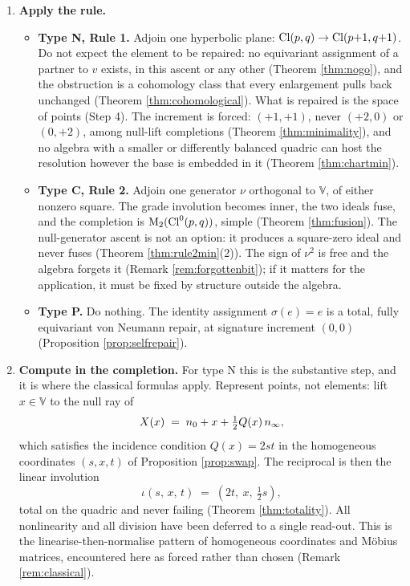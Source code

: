 \begin{enumerate}
\item[\textbf{Step 3.}] \textbf{Apply the rule.}
  \begin{itemize}
  \item \textbf{Type N, Rule 1.} Adjoin one hyperbolic plane: $\mathrm{Cl}(p,q) \to \mathrm{Cl}(p{+}1,q{+}1)$. Do not expect the element to be repaired: no equivariant assignment of a partner to $v$ exists, in this ascent or any other (Theorem \ref{thm:nogo}), and the obstruction is a cohomology class that every enlargement pulls back unchanged (Theorem \ref{thm:cohomological}). What is repaired is the space of points (Step 4). The increment is forced: $(+1,+1)$, never $(+2,0)$ or $(0,+2)$, among null-lift completions (Theorem \ref{thm:minimality}), and no algebra with a smaller or differently balanced quadric can host the resolution however the base is embedded in it (Theorem \ref{thm:chartmin}).
  \item \textbf{Type C, Rule 2.} Adjoin one generator $\nu$ orthogonal to $\mathbb{V}$, of either nonzero square. The grade involution becomes inner, the two ideals fuse, and the completion is $\mathrm{M}_2(\mathrm{Cl}^0(p,q))$, simple (Theorem \ref{thm:fusion}). The null-generator ascent is not an option: it produces a square-zero ideal and never fuses (Theorem \ref{thm:rule2min}(2)). The sign of $\nu^2$ is free and the algebra forgets it (Remark \ref{rem:forgottenbit}); if it matters for the application, it must be fixed by structure outside the algebra.
  \item \textbf{Type P.} Do nothing. The identity assignment $\sigma(e) = e$ is a total, fully equivariant von Neumann repair, at signature increment $(0,0)$ (Proposition \ref{prop:selfrepair}).
  \end{itemize}

\item[\textbf{Step 4.}] \textbf{Compute in the completion.} For type N this is the substantive step, and it is where the classical formulas apply. Represent points, not elements: lift $x \in \mathbb{V}$ to the null ray of
  \[
  X(x) \;=\; n_0 + x + \tfrac12 Q(x)\,n_\infty ,
  \]
  which satisfies the incidence condition $Q(x) = 2st$ in the homogeneous coordinates $(s,x,t)$ of Proposition \ref{prop:swap}. The reciprocal is then the linear involution
  \[
  \iota(s,\,x,\,t) \;=\; (2t,\ x,\ \tfrac12 s),
  \]
  total on the quadric and never failing (Theorem \ref{thm:totality}). All nonlinearity and all division have been deferred to a single read-out. This is the linearise-then-normalise pattern of homogeneous coordinates and M\"obius matrices, encountered here as forced rather than chosen (Remark \ref{rem:classical}).


\end{enumerate}
